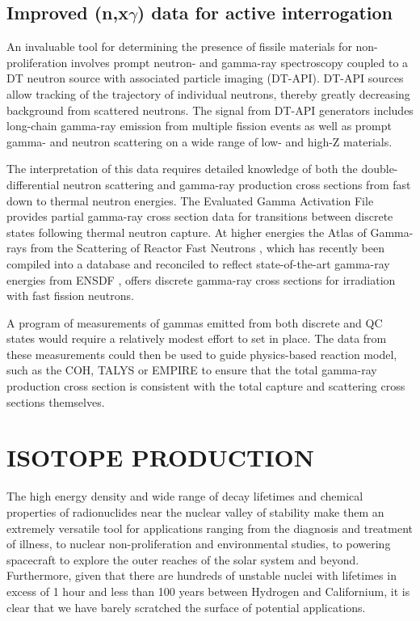\documentclass[letterpaper]{ar-1col}
\begin{document}
\subsection{Improved (n,x$\gamma$) data for active interrogation}

An invaluable tool for determining the presence of fissile materials for non-proliferation involves prompt neutron- and gamma-ray spectroscopy coupled to a DT neutron source with associated particle imaging (DT-API).   DT-API sources allow tracking of the trajectory of individual neutrons, thereby greatly decreasing background from scattered neutrons.  The signal from DT-API generators includes long-chain gamma-ray emission from multiple fission events \cite{Pra12,Nak10} as well as prompt gamma- and neutron scattering on a wide range of low- and high-Z materials.   

The interpretation of this data requires detailed knowledge of both the double-differential neutron scattering and gamma-ray production cross sections from fast down to thermal neutron energies.  The Evaluated Gamma Activation File \cite{Fir14} provides partial gamma-ray cross section data for transitions between discrete states following thermal neutron capture.  At higher energies the Atlas of Gamma-rays from the Scattering of Reactor Fast Neutrons \cite{Dem78}, which has recently been compiled into a database and reconciled to reflect state-of-the-art gamma-ray energies from ENSDF \cite{Hur18}, offers discrete gamma-ray cross sections for irradiation with fast fission neutrons.  

A program of measurements of gammas emitted from both discrete and QC states would require a relatively modest effort to set in place.  The data from these measurements could then be used to guide physics-based reaction model, such as the COH, TALYS or EMPIRE to ensure that the total gamma-ray production cross section is consistent with the total capture and scattering cross sections themselves. 


\section{ISOTOPE PRODUCTION}\label{sec:isotope_production}


The high energy density and wide range of decay lifetimes and chemical properties of radionuclides near the nuclear valley of stability make them an extremely versatile tool for applications ranging from the diagnosis and treatment of illness, to nuclear non-proliferation and environmental studies, to powering spacecraft to explore the outer reaches of the solar system and beyond. Furthermore, given that there are hundreds of unstable nuclei with lifetimes in excess of 1 hour and less than 100 years between Hydrogen and Californium, it is clear that we have barely scratched the surface of potential applications.
\end{document}
